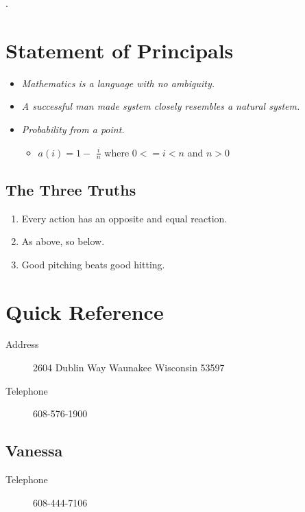 \documentclass[12pt,twoside]{article}
\begin{document}
\addtolength{\oddsidemargin}{0in}
\addtolength{\evensidemargin}{-01.25in}
\addtolength{\textwidth}{1.4in}
\addtolength{\topmargin}{-1.25in}
\addtolength{\textheight}{2.45in}
\setcounter{tocdepth}{3}
\vspace*{1cm} 
\newpage
{}
\setcounter{tocdepth}{2}
\pagestyle{fancy}
\fancyhf[C]{}
\setlength{\headheight}{14.49998pt}
\addtolength{\topmargin}{0.29998pt}.
\setcounter{tocdepth}{2}
\tableofcontents
 \newpage
{}
\section{Statement of Principals}
\label{sec:orga078326}
\begin{itemize}
\item \emph{Mathematics is a language with no ambiguity.}
\item \emph{A successful man made system closely resembles a natural system.}
\item \emph{Probability from a point.}
\begin{itemize}
\item \(a(i) = 1-\) \Large \(\frac{i}{n}\) \normalsize where \(0 <= i < n\) and \(n > 0\)
\end{itemize}
\end{itemize}
\subsection{The Three Truths}
\label{sec:org32f21d6}
\begin{enumerate}
\item Every action has an opposite and equal reaction.
\item As above, so below.
\item Good pitching beats good hitting.
\end{enumerate}
\section{Quick Reference}
\label{sec:org331d3f5}
\begin{description}
\item[{Address}] 2604 Dublin Way Waunakee Wisconsin 53597
\item[{Telephone}] 608-576-1900
\end{description}
\subsection{Vanessa}
\label{sec:orgfcb67c0}
\begin{description}
\item[{Telephone}] 608-444-7106
\end{description}
\end{document}
